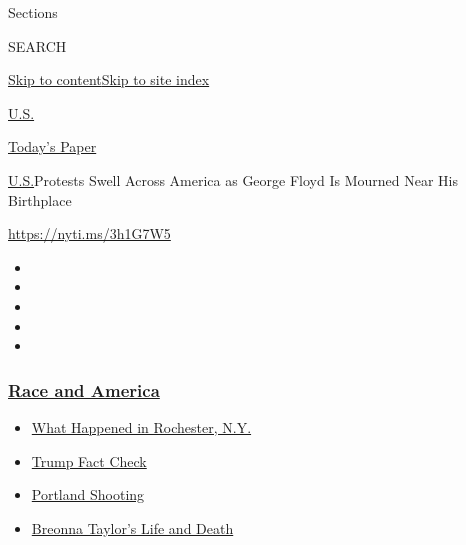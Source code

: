 Sections

SEARCH

\protect\hyperlink{site-content}{Skip to
content}\protect\hyperlink{site-index}{Skip to site index}

\href{https://www.nytimes3xbfgragh.onion/section/us}{U.S.}

\href{https://myaccount.nytimes3xbfgragh.onion/auth/login?response_type=cookie\&client_id=vi}{}

\href{https://www.nytimes3xbfgragh.onion/section/todayspaper}{Today's
Paper}

\href{/section/us}{U.S.}\textbar{}Protests Swell Across America as
George Floyd Is Mourned Near His Birthplace

\url{https://nyti.ms/3h1G7W5}

\begin{itemize}
\item
\item
\item
\item
\item
\end{itemize}

\hypertarget{race-and-america}{%
\subsubsection{\texorpdfstring{\href{https://www.nytimes3xbfgragh.onion/news-event/george-floyd-protests-minneapolis-new-york-los-angeles?name=styln-george-floyd\&region=TOP_BANNER\&block=storyline_menu_recirc\&action=click\&pgtype=Article\&impression_id=480ab990-f2bb-11ea-b6d0-db771f60a042\&variant=undefined}{Race
and America}}{Race and America}}\label{race-and-america}}

\begin{itemize}
\tightlist
\item
  \href{https://www.nytimes3xbfgragh.onion/2020/09/04/nyregion/rochester-police-daniel-prude.html?name=styln-george-floyd\&region=TOP_BANNER\&block=storyline_menu_recirc\&action=click\&pgtype=Article\&impression_id=480b07b0-f2bb-11ea-b6d0-db771f60a042\&variant=undefined}{What
  Happened in Rochester, N.Y.}
\item
  \href{https://www.nytimes3xbfgragh.onion/2020/09/01/us/politics/trump-fact-check-protests.html?name=styln-george-floyd\&region=TOP_BANNER\&block=storyline_menu_recirc\&action=click\&pgtype=Article\&impression_id=480b07b1-f2bb-11ea-b6d0-db771f60a042\&variant=undefined}{Trump
  Fact Check}
\item
  \href{https://www.nytimes3xbfgragh.onion/2020/08/30/us/portland-shooting-explained.html?name=styln-george-floyd\&region=TOP_BANNER\&block=storyline_menu_recirc\&action=click\&pgtype=Article\&impression_id=480b07b2-f2bb-11ea-b6d0-db771f60a042\&variant=undefined}{Portland
  Shooting}
\item
  \href{https://www.nytimes3xbfgragh.onion/2020/08/30/us/breonna-taylor-police-killing.html?name=styln-george-floyd\&region=TOP_BANNER\&block=storyline_menu_recirc\&action=click\&pgtype=Article\&impression_id=480b55d0-f2bb-11ea-b6d0-db771f60a042\&variant=undefined}{Breonna
  Taylor's Life and Death}
\end{itemize}


